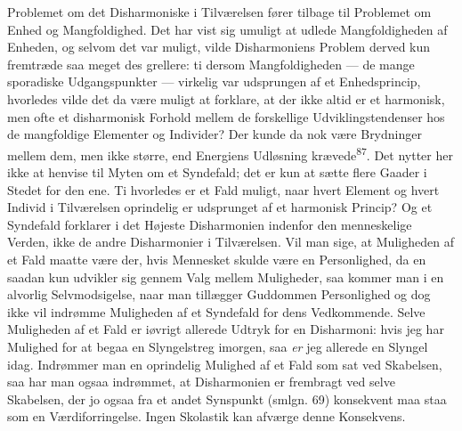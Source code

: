 \documentclass[12pt,a4paper,openany]{book}
\newcommand{\opage}[1]{\marginnote{\footnotesize\textit{[#1]}}}
\begin{document}
Problemet om det Disharmoniske i Tilværelsen fører tilbage til Problemet
om Enhed og Mangfoldighed. Det har vist sig umuligt at udlede
Mangfoldigheden af Enheden, og selvom det var muligt, vilde
Disharmoniens Problem derved kun fremtræde saa meget des grellere: ti
dersom Mangfoldigheden --- de mange sporadiske Udgangspunkter ---
virkelig var udsprungen af et Enhedsprincip, hvorledes vilde det da være
muligt at forklare, at der ikke altid er et harmonisk, men ofte et
disharmonisk Forhold
\opage{181}mellem de forskellige Udviklingstendenser hos de mangfoldige
Elementer og Individer? Der kunde da nok være Brydninger mellem dem, men
ikke større, end Energiens Udløsning krævede\textsuperscript{87}. Det
nytter her ikke at henvise til Myten om et Syndefald; det er kun at
sætte flere Gaader i Stedet for den ene. Ti hvorledes er et Fald muligt,
naar hvert Element og hvert Individ i Tilværelsen oprindelig er
udsprunget af et harmonisk Princip? Og et Syndefald forklarer i det
Højeste Disharmonien indenfor den menneskelige Verden, ikke de andre
Disharmonier i Tilværelsen. Vil man sige, at Muligheden af et Fald
maatte være der, hvis Mennesket skulde være en Personlighed, da en
saadan kun udvikler sig gennem Valg mellem Muligheder, saa kommer man i
en alvorlig Selvmodsigelse, naar man tillægger Guddommen Personlighed og
dog ikke vil indrømme Muligheden af et Syndefald for dens Vedkommende.
Selve Muligheden af et Fald er iøvrigt allerede Udtryk for en
Disharmoni: hvis jeg har Mulighed for at begaa en Slyngelstreg imorgen,
saa \textit{er} jeg allerede en Slyngel idag. Indrømmer man en
oprindelig Mulighed af et Fald som sat ved Skabelsen, saa har man ogsaa
indrømmet, at Disharmonien er frembragt ved selve Skabelsen, der jo
ogsaa fra et andet Synspunkt (smlgn. 69) konsekvent maa staa som en
Værdiforringelse. Ingen Skolastik kan afværge denne Konsekvens.
\end{document}
